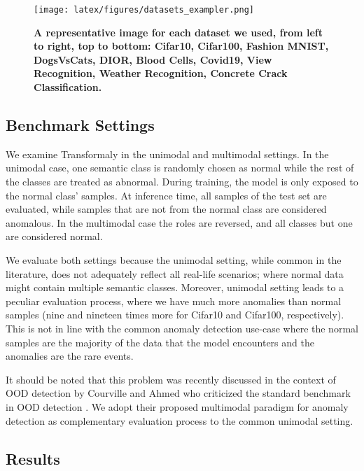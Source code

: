 \documentclass[10pt,twocolumn,letterpaper]{article}
\begin{document}
 
\begin{figure}[t]
\begin{center}
\texttt{[image: latex/figures/datasets\_exampler.png]}
\end{center}
  \caption{ \bf{A representative image for each dataset we used, from left to right, top to bottom:} Cifar10, Cifar100, Fashion MNIST, DogsVsCats, DIOR, Blood Cells, Covid19, View Recognition, Weather Recognition, Concrete Crack Classification.}
\label{fig:datasets_exampler}
\end{figure}
\subsection{Benchmark Settings}

We examine Transformaly in the unimodal and multimodal settings. In the unimodal case, one semantic class is randomly chosen as normal while the rest of the classes are treated as abnormal. During training, the model is only exposed to the normal class’ samples. At inference time, all samples of the test set are evaluated, while samples that are not from the normal class are considered anomalous. In the multimodal case the roles are reversed, and all classes but one are considered normal.

We evaluate both settings because the unimodal setting, while common in the literature, does not adequately reflect all real-life scenarios; where normal data might contain multiple semantic classes. Moreover, unimodal setting leads to a peculiar evaluation process, where we have much more anomalies than normal samples (nine and nineteen times more for Cifar10 and Cifar100, respectively). This is not in line with the common anomaly detection use-case where the normal samples are the majority of the data that the model encounters and the anomalies are the rare events.







It should be noted that this problem was recently discussed in the context of OOD detection by Courville and Ahmed who criticized the standard benchmark in OOD detection \cite{ahmed2020detecting}.  We adopt their proposed multimodal paradigm for anomaly detection as complementary evaluation process to the common unimodal setting. 



%
 
\subsection{Results}
\end{document}
